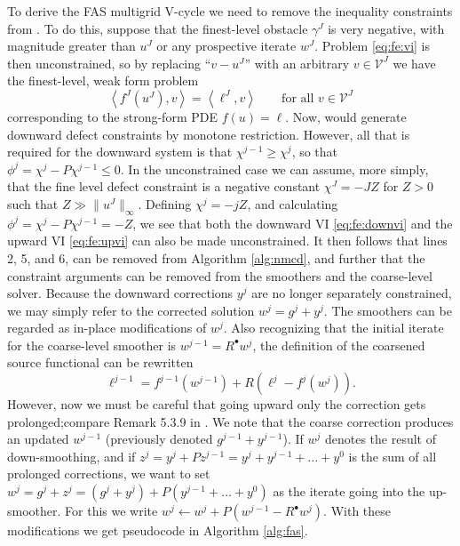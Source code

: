 \documentclass[letterpaper,final,12pt,reqno]{amsart}
\theoremstyle{cstyle}
\theoremstyle{cstyle*}
\theoremstyle{dstyle}
\numberwithin{equation}{section}
\numberwithin{figure}{section}
\numberwithin{table}{section}
\numberwithin{theorem}{section}
\newcommand{\ip}[2]{\left<#1,#2\right>}
\newcommand{\iR}{R^{\bullet}}
\begin{document}
To derive the FAS multigrid V-cycle we need to remove the inequality constraints from .  To do this, suppose that the finest-level obstacle $\gamma^J$ is very negative, with magnitude greater than $u^J$ or any prospective iterate $w^J$.  Problem \eqref{eq:fe:vi} is then unconstrained, so by replacing ``$v-u^J$'' with an arbitrary $v \in \mathcal{V}^J$ we have the finest-level, weak form problem
\begin{equation}
\ip{f^J(u^J)}{v} = \ip{\ell^J}{v} \qquad \text{for all } v\in \mathcal{V}^J \label{eq:app:fas:pde}
\end{equation}
corresponding to the strong-form PDE $f(u)=\ell$.  Now,  would generate downward defect constraints by monotone restriction.  However, all that is required for the downward system is that $\chi^{j-1} \ge \chi^j$, so that $\phi^j = \chi^j - P \chi^{j-1} \le 0$.  In the unconstrained case we can assume, more simply, that the fine level defect constraint is a negative constant $\chi^J = -JZ$ for $Z>0$ such that $Z \gg \|u^J\|_\infty$.  Defining $\chi^j = - jZ$, and calculating $\phi^j = \chi^j - P \chi^{j-1} = - Z$, we see that both the downward VI \eqref{eq:fe:downvi} and the upward VI \eqref{eq:fe:upvi} can also be made unconstrained.  It then follows that lines 2, 5, and 6, can be removed from Algorithm \ref{alg:nmcd}, and further that the constraint arguments can be removed from the smoothers and the coarse-level solver.  Because the downward corrections $y^j$ are no longer separately constrained, we may simply refer to the corrected solution $w^j=g^j+y^j$.  The smoothers can be regarded as in-place modifications of $w^j$.  Also recognizing that the initial iterate for the coarse-level smoother is $w^{j-1}=\iR w^j$, the definition of the coarsened source functional can be rewritten
\begin{equation}
\ell^{j-1} = f^{j-1}\left(w^{j-1}\right) + R\left(\ell^j-f^j(w^j)\right). \label{eq:app:fas:levelsource}
\end{equation}
However, now we must be careful that going upward only the correction gets prolonged;compare Remark 5.3.9 in \cite{Trottenbergetal2001}.  We note that the coarse correction produces an updated $w^{j-1}$ (previously denoted $g^{j-1}+y^{j-1}$).  If $w^j$ denotes the result of down-smoothing, and if $z^j = y^j + P z^{j-1} = y^j + y^{j-1} + \dots + y^0$ is the sum of all prolonged corrections, we want to set $w^j = g^j + z^j = (g^j+y^j) + P(y^{j-1} + \dots + y^0)$ as the iterate going into the up-smoother.  For this we write $w^j \gets w^j + P(w^{j-1} - \iR w^j)$.  With these modifications we get pseudocode in Algorithm \ref{alg:fas}.
\end{document}
